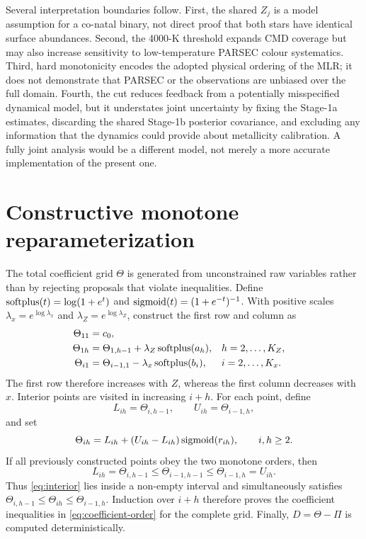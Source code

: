 \FloatBarrier
Several interpretation boundaries follow.  First, the shared $Z_j$ is a model
assumption for a co-natal binary, not direct proof that both stars have identical
surface abundances.  Second, the 4000-K threshold expands CMD coverage but may
also increase sensitivity to low-temperature PARSEC colour systematics.  Third,
hard monotonicity encodes the adopted physical ordering of the MLR; it does not
demonstrate that PARSEC or the observations are unbiased over the full domain.
Fourth, the cut reduces feedback from a potentially misspecified dynamical
model, but it understates joint uncertainty by fixing the Stage-1a estimates,
discarding the shared Stage-1b posterior covariance, and excluding any
information that the dynamics could provide about metallicity calibration.  A
fully joint analysis would be a different model,
not merely a more accurate implementation of the present one.


\section{Constructive monotone reparameterization}
\label{app:monotone}

The total coefficient grid $\Theta$ is generated from unconstrained raw
variables rather than by rejecting proposals that violate inequalities.  Define
$\operatorname{softplus}(t)=\log(1+e^t)$ and
$\operatorname{sigmoid}(t)=(1+e^{-t})^{-1}$.  With positive scales
$\lambda_x=e^{\log\lambda_x}$ and $\lambda_Z=e^{\log\lambda_Z}$, construct the
first row and column as
\begin{align}
 \Theta_{11}&=c_0,\\
 \Theta_{1h}&=\Theta_{1,h-1}+\lambda_Z\operatorname{softplus}(a_h),
 &&h=2,\ldots,K_Z,\\
 \Theta_{i1}&=\Theta_{i-1,1}-\lambda_x\operatorname{softplus}(b_i),
 &&i=2,\ldots,K_x.
 \label{eq:boundaries}
\end{align}
The first row therefore increases with $Z$, whereas the first column decreases
with $x$.  Interior points are visited in increasing $i+h$.  For each point,
define
\begin{equation}
 L_{ih}=\Theta_{i,h-1},\qquad U_{ih}=\Theta_{i-1,h},
\end{equation}
and set
\begin{equation}
 \Theta_{ih}=L_{ih}+(U_{ih}-L_{ih})\operatorname{sigmoid}(r_{ih}),
 \qquad i,h\ge2.
 \label{eq:interior}
\end{equation}
If all previously constructed points obey the two monotone orders, then
\begin{equation}
 L_{ih}=\Theta_{i,h-1}\le\Theta_{i-1,h-1}\le
 \Theta_{i-1,h}=U_{ih}.
\end{equation}
Thus \cref{eq:interior} lies inside a non-empty interval and simultaneously
satisfies
$\Theta_{i,h-1}\le\Theta_{ih}\le\Theta_{i-1,h}$.  Induction over $i+h$
therefore proves the coefficient inequalities in \cref{eq:coefficient-order}
for the complete grid.  Finally, $D=\Theta-\Pi$ is computed deterministically.

